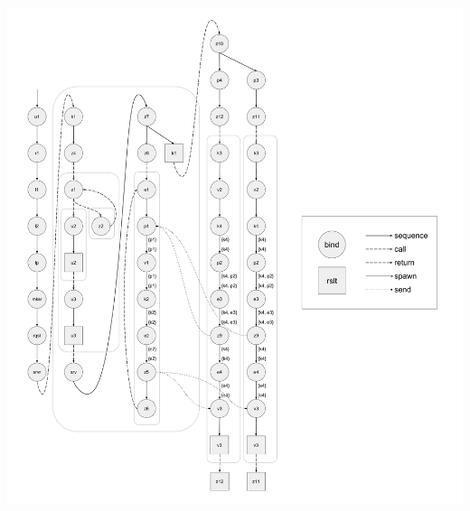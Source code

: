 \documentclass[letterpaper, 11pt]{extarticle}
\begin{document}
\includegraphics[width=1\textwidth]{cml-liveness-analysis-k4.pdf}
\end{document}
